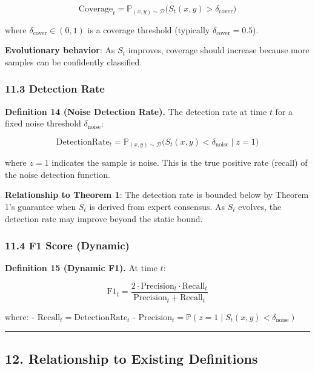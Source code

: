 \documentclass[
  12pt,
]{article}
\begin{document}
\[\text{Coverage}_t = \mathbb{P}_{(x,y) \sim \mathcal{D}} \bigl( S_t(x,y) > \delta_{\text{cover}} \bigr)\]

where \(\delta_{\text{cover}} \in (0,1)\) is a coverage threshold
(typically \(\delta_{\text{cover}} = 0.5\)).

\textbf{Evolutionary behavior}: As \(S_t\) improves, coverage should
increase because more samples can be confidently classified.

\subsubsection{11.3 Detection Rate}\label{detection-rate}

\textbf{Definition 14 (Noise Detection Rate).} The detection rate at
time \(t\) for a fixed noise threshold \(\delta_{\text{noise}}\):

\[\text{DetectionRate}_t = \mathbb{P}_{(x,y) \sim \mathcal{D}} \bigl( S_t(x,y) < \delta_{\text{noise}} \mid z = 1 \bigr)\]

where \(z=1\) indicates the sample is noise. This is the true positive
rate (recall) of the noise detection function.

\textbf{Relationship to Theorem 1}: The detection rate is bounded below
by Theorem 1's guarantee when \(S_t\) is derived from expert consensus.
As \(S_t\) evolves, the detection rate may improve beyond the static
bound.

\subsubsection{11.4 F1 Score (Dynamic)}\label{f1-score-dynamic}

\textbf{Definition 15 (Dynamic F1).} At time \(t\):

\[\text{F1}_t = \frac{2 \cdot \text{Precision}_t \cdot \text{Recall}_t}{\text{Precision}_t + \text{Recall}_t}\]

where: - \(\text{Recall}_t = \text{DetectionRate}_t\) -
\(\text{Precision}_t = \mathbb{P}(z = 1 \mid S_t(x,y) < \delta_{\text{noise}})\)

\begin{center}\rule{0.5\linewidth}{0.5pt}\end{center}

\subsection{12. Relationship to Existing
Definitions}\label{relationship-to-existing-definitions}
\end{document}
